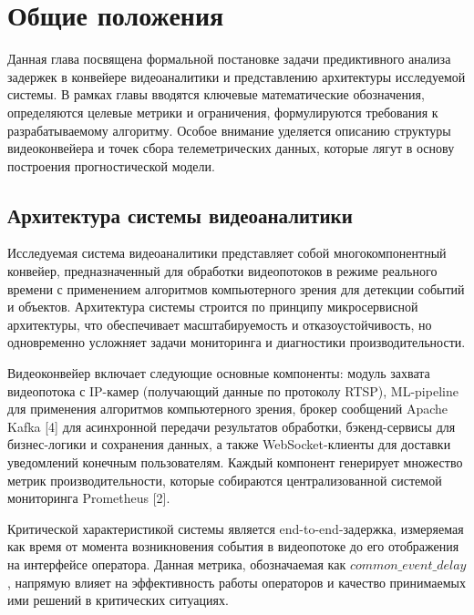 \chapter{Общие положения}

\hspace*{1.25cm}Данная глава посвящена формальной постановке задачи предиктивного анализа задержек в конвейере видеоаналитики и представлению архитектуры исследуемой системы. В рамках главы вводятся ключевые математические обозначения, определяются целевые метрики и ограничения, формулируются требования к разрабатываемому алгоритму. Особое внимание уделяется описанию структуры видеоконвейера и точек сбора телеметрических данных, которые лягут в основу построения прогностической модели.

\section{Архитектура системы видеоаналитики}

\hspace*{1.25cm}Исследуемая система видеоаналитики представляет собой многокомпонентный конвейер, предназначенный для обработки видеопотоков в режиме реального времени с применением алгоритмов компьютерного зрения для детекции событий и объектов. Архитектура системы строится по принципу микросервисной архитектуры, что обеспечивает масштабируемость и отказоустойчивость, но одновременно усложняет задачи мониторинга и диагностики производительности.

\hspace*{1.25cm}Видеоконвейер включает следующие основные компоненты: модуль захвата видеопотока с IP-камер (получающий данные по протоколу RTSP), ML-pipeline для применения алгоритмов компьютерного зрения, брокер сообщений Apache Kafka [4] для асинхронной передачи результатов обработки, бэкенд-сервисы для бизнес-логики и сохранения данных, а также WebSocket-клиенты для доставки уведомлений конечным пользователям. Каждый компонент генерирует множество метрик производительности, которые собираются централизованной системой мониторинга Prometheus [2].

\hspace*{1.25cm}Критической характеристикой системы является end-to-end-задержка, измеряемая как время от момента возникновения события в видеопотоке до его отображения на интерфейсе оператора. Данная метрика, обозначаемая как $common\_event\_delay$, напрямую влияет на эффективность работы операторов и качество принимаемых ими решений в критических ситуациях.

